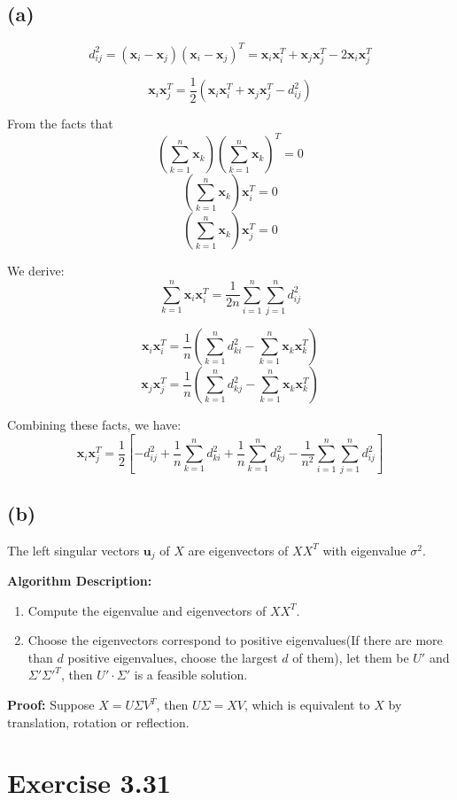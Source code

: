 \documentclass[paper=a4, fontsize=11pt]{scrartcl} %
\numberwithin{equation}{section} %
\numberwithin{figure}{section} %
\numberwithin{table}{section} %
\begin{document}
\subsection*{(a)}
$$d_{ij}^2 = (\mathbf{x}_i - \mathbf{x}_j)(\mathbf{x}_i - \mathbf{x}_j)^T = \mathbf{x}_i\mathbf{x}_i^T + \mathbf{x}_j\mathbf{x}_j^T - 2\mathbf{x}_i\mathbf{x}_j^T $$

$$\mathbf{x}_i\mathbf{x}_j^T = \frac{1}{2}\left(\mathbf{x}_i\mathbf{x}_i^T + \mathbf{x}_j\mathbf{x}_j^T - d_{ij}^2\right) $$

From the facts that $$\left(\sum_{k=1}^{n}\mathbf{x}_k\right)\left(\sum_{k=1}^{n}\mathbf{x}_k\right)^T = 0$$
$$\left(\sum_{k=1}^{n}\mathbf{x}_k\right)\mathbf{x}_i^T = 0$$
$$\left(\sum_{k=1}^{n}\mathbf{x}_k\right)\mathbf{x}_j^T = 0$$

We derive:
$$\sum_{k=1}^{n}\mathbf{x}_i\mathbf{x}_i^T = \frac{1}{2n} \sum_{i=1}^{n}\sum_{j=1}^{n}d_{ij}^2 $$

$$\mathbf{x}_i\mathbf{x}_i^T = \frac{1}{n}\left(\sum_{k=1}^{n} d_{ki}^2 - \sum_{k=1}^{n}\mathbf{x}_k\mathbf{x}_k^T\right) $$
$$\mathbf{x}_j\mathbf{x}_j^T = \frac{1}{n}\left(\sum_{k=1}^{n} d_{kj}^2 - \sum_{k=1}^{n}\mathbf{x}_k\mathbf{x}_k^T\right) $$

Combining these facts, we have:
$$\mathbf{x}_i\mathbf{x}_j^T = \frac{1}{2}\left[-d_{ij}^2 + \frac{1}{n}\sum_{k=1}^{n}d_{ki}^2 + \frac{1}{n}\sum_{k=1}^{n}d_{kj}^2 - \frac{1}{n^2}\sum_{i=1}^{n}\sum_{j=1}^{n}d_{ij}^2 \right] $$
\subsection*{(b)}
The left singular vectors $\mathbf{u}_j$ of $X$ are eigenvectors of $XX^T$ with eigenvalue $\sigma^2$.

\textbf{Algorithm Description:}
\begin{enumerate}
	\item Compute the eigenvalue and eigenvectors of $XX^T$.
	\item Choose the eigenvectors correspond to positive eigenvalues(If there are more than $d$ positive eigenvalues, choose the largest $d$ of them), let them be $U'$ and $\Sigma'\Sigma'^T$, then $U'\cdot \Sigma'$ is a feasible solution. 
\end{enumerate}

\textbf{Proof:}
Suppose $X = U\Sigma V^T$, then $U\Sigma = XV$, which is equivalent to $X$ by translation, rotation or reflection.
\section*{Exercise 3.31}
\end{document}
